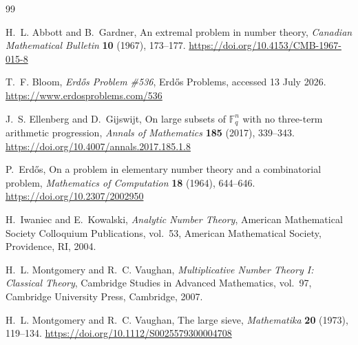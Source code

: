\documentclass[11pt]{article}
\numberwithin{equation}{section}
\theoremstyle{plain}
\newcommand{\1}{\mathbf 1}
\begin{document}
\begin{thebibliography}{99}
\raggedright

H.~L. Abbott and B.~Gardner,
\newblock An extremal problem in number theory,
\newblock \emph{Canadian Mathematical Bulletin} \textbf{10} (1967),
173--177.
\newblock \url{https://doi.org/10.4153/CMB-1967-015-8}

T.~F. Bloom,
\newblock \emph{Erd\H{o}s Problem \#536},
\newblock Erd\H{o}s Problems, accessed 13 July 2026.
\newblock \url{https://www.erdosproblems.com/536}

J.~S. Ellenberg and D.~Gijswijt,
\newblock On large subsets of $\mathbb F_q^n$ with no three-term arithmetic
progression,
\newblock \emph{Annals of Mathematics} \textbf{185} (2017), 339--343.
\newblock \url{https://doi.org/10.4007/annals.2017.185.1.8}

P.~Erd\H{o}s,
\newblock On a problem in elementary number theory and a combinatorial
problem,
\newblock \emph{Mathematics of Computation} \textbf{18} (1964), 644--646.
\newblock \url{https://doi.org/10.2307/2002950}

H.~Iwaniec and E.~Kowalski,
\newblock \emph{Analytic Number Theory},
\newblock American Mathematical Society Colloquium Publications, vol.~53,
American Mathematical Society, Providence, RI, 2004.

H.~L. Montgomery and R.~C. Vaughan,
\newblock \emph{Multiplicative Number Theory I: Classical Theory},
\newblock Cambridge Studies in Advanced Mathematics, vol.~97,
Cambridge University Press, Cambridge, 2007.

H.~L. Montgomery and R.~C. Vaughan,
\newblock The large sieve,
\newblock \emph{Mathematika} \textbf{20} (1973), 119--134.
\newblock \url{https://doi.org/10.1112/S0025579300004708}

\end{thebibliography}
\end{document}
